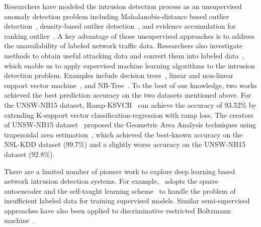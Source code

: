 \label{CompareDL:Sec:RelatedWorks}

Researchers have modeled the intrusion detection process as an unsupervised
anomaly detection problem including Mahalanobis-distance based outlier detection~\cite{ComparativeAnomalyNIDS},
density-based outlier detection~\cite{LOF}, and evidence accumulation for ranking outlier~\cite{RankingOutliner}.
A key advantage of those unsupervised approaches is to address the unavailability of labeled network traffic data.
Researchers also investigate methods to obtain useful attacking data and convert them into labeled data~\cite{KDDCup, NSL-KDD, UNSW},
which enable us to apply supervised machine learning algorithms to the intrusion detection problem.
Examples include decision trees~\cite{DecisionTree}, linear and non-linear support vector machine~\cite{SVM},
and NB-Tree~\cite{NB-Tree}. To the best of our knowledge, two works achieved the best prediction accuracy on the two datasets mentioned above.
For the UNSW-NB15 dataset, Ramp-KSVCR~\cite{RampLossKSVCR} can achieve the accuracy of 93.52\% by extending K-support vector classification-regression with ramp loss. 
The creators of UNSW-NB15 dataset~\cite{UNSW} proposed the Geometric Area Analysis techniques using trapezoidal area estimation~\cite{GAA-ADS},
which achieved the best-known accuracy on the NSL-KDD dataset (99.7\%) and
a slightly worse accuracy on the UNSW-NB15 dataset (92.8\%).

There are a limited number of pioneer work to explore deep learning based network intrusion detection systems.
For example,~\cite{STL-NIDS} adopts the sparse autoencoder and the self-taught learning scheme~\cite{SparseAE}
to handle the problem of insufficient labeled data for training supervised models.
Similar semi-supervised approaches have also been applied to discriminative restricted Boltzmann machine~\cite{AnomalyDetectionRBM}.

